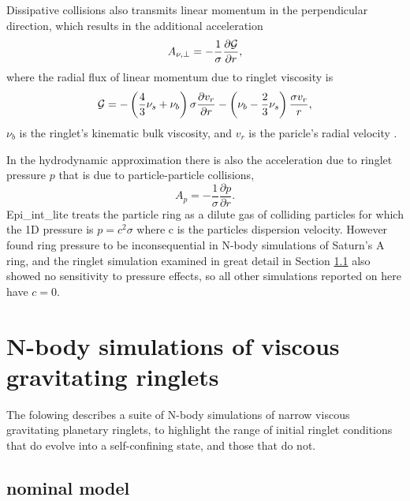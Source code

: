 \documentclass[preprint]{aastex62}
\begin{document}
Dissipative collisions also transmits linear momentum in the perpendicular direction,
which results in the additional acceleration
\begin{equation}
\label{eqn:bulk_viscosity}
    A_{\nu, \perp}=-\frac{1}{\sigma}\frac{\partial {\cal G}}{\partial r},
\end{equation}
where the radial flux of linear momentum due to ringlet viscosity is
\begin{equation}
    \label{eqn:G}
    {\cal G} = -\left(\frac{4}{3}\nu_s + \nu_b\right)\sigma\frac{\partial v_r}{\partial r}
        -\left(\nu_b - \frac{2}{3}\nu_s\right)\frac{\sigma v_r}{r},
\end{equation}
$\nu_b$ is the ringlet's kinematic bulk viscosity, and $v_r$ is the paricle's radial velocity
\citep{HS13}.

In the hydrodynamic approximation there is also the acceleration due to ringlet pressure $p$
that is due to particle-particle collisions,
\begin{equation}
\label{eqn:pressure}
    A_p=-\frac{1}{\sigma }\frac{\partial p}{\partial r}.
\end{equation}
Epi\_int\_lite treats the particle ring as a dilute gas of
colliding particles for which the 1D pressure is $p=c^2\sigma$ where
c is the particles dispersion velocity. However \cite{HS13} found ring pressure
to be inconsequential in N-body simulations of Saturn's A ring, and the ringlet simulation
examined in great detail in Section \ref{subsec:nominal} 
also showed no sensitivity to pressure effects, so all other
simulations reported on here have $c=0$.

\section{N-body simulations of viscous gravitating ringlets}
\label{sec:nbody}

The folowing describes a suite of N-body simulations of narrow viscous gravitating planetary
ringlets, to highlight the range of initial ringlet conditions that do evolve into
a self-confining state, and those that do not.

\subsection{nominal model}
\label{subsec:nominal}
\end{document}
